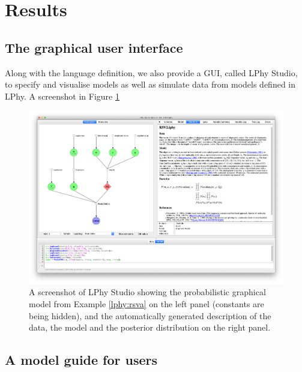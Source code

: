 \documentclass[10pt,letterpaper,table]{article}
\begin{document}
{%
\section{Results}

\subsection{The graphical user interface}
Along with the language definition, we also provide a GUI, called LPhy Studio, to specify and visualise models as well as simulate data from models defined in LPhy. A screenshot in Figure \ref{fig:lphystudio} 

\begin{figure}
  \includegraphics[width=\textwidth]{figs/lphystudio_screenshot.png}
  \caption{A screenshot of LPhy Studio showing the probabilistic
    graphical model from Example \ref{lphy:rsva} on the left panel
    (constants are being hidden), and the automatically generated
    description of the data, the model and the posterior
    distribution on the right panel.} 
  \label{fig:lphystudio}
\end{figure}

\subsection{A model guide for users}

}
\end{document}
